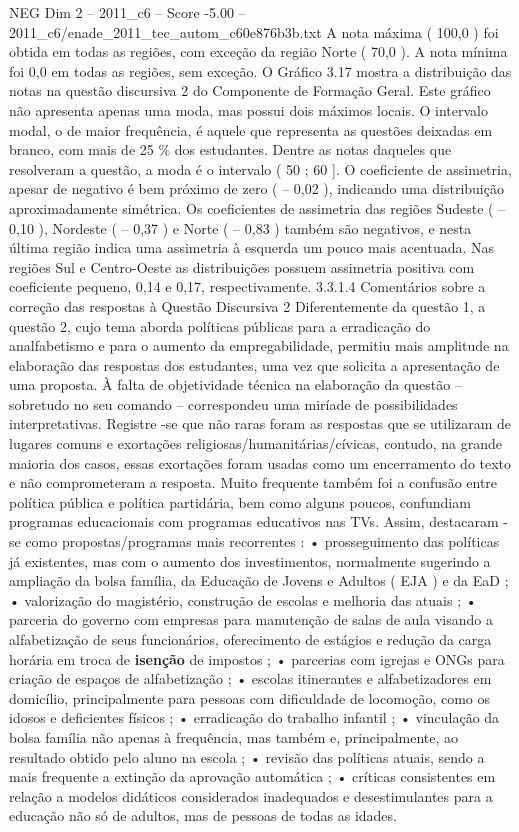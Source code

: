 \begin{textsample}{NEG Dim 2 – 2011\_c6 – Score -5.00 – 2011\_c6/enade\_2011\_tec\_autom\_c60e876b3b.txt}
A nota máxima ( 100,0 ) foi obtida em todas as regiões, com exceção da região Norte ( 70,0 ).
A nota mínima foi 0,0 em todas as regiões, sem exceção.
O Gráfico 3.17 mostra a distribuição das notas na questão discursiva 2 do Componente de Formação Geral.
Este gráfico não apresenta apenas uma moda, mas possui dois máximos locais.
O intervalo modal, o de maior frequência, é aquele que representa as questões deixadas em branco, com mais de 25 \% dos estudantes.
Dentre as notas daqueles que resolveram a questão, a moda é o intervalo ( 50 ; 60 ].
O coeficiente de assimetria, apesar de negativo é bem próximo de zero ( – 0,02 ), indicando uma distribuição aproximadamente simétrica.
Os coeficientes de assimetria das regiões Sudeste ( – 0,10 ), Nordeste ( – 0,37 ) e Norte ( – 0,83 ) também são negativos, e nesta última região indica uma assimetria à esquerda um pouco mais acentuada.
Nas regiões Sul e Centro-Oeste as distribuições possuem assimetria positiva com coeficiente pequeno, 0,14 e 0,17, respectivamente. 3.3.1.4 Comentários sobre a correção das respostas à Questão Discursiva 2 Diferentemente da questão 1, a questão 2, cujo tema aborda políticas públicas para a erradicação do analfabetismo e para o aumento da empregabilidade, permitiu mais amplitude na elaboração das respostas dos estudantes, uma vez que solicita a apresentação de uma proposta.
À falta de objetividade técnica na elaboração da questão – sobretudo no seu comando – correspondeu uma miríade de possibilidades interpretativas.
Registre -se que não raras foram as respostas que se utilizaram de lugares comuns e exortações religiosas/humanitárias/cívicas, contudo, na grande maioria dos casos, essas exortações foram usadas como um encerramento do texto e não comprometeram a resposta.
Muito frequente também foi a confusão entre política pública e política partidária, bem como alguns poucos, confundiam programas educacionais com programas educativos nas TVs.
Assim, destacaram -se como propostas/programas mais recorrentes : • prosseguimento das políticas já existentes, mas com o aumento dos investimentos, normalmente sugerindo a ampliação da bolsa família, da Educação de Jovens e Adultos ( EJA ) e da EaD ; • valorização do magistério, construção de escolas e melhoria das atuais ; • parceria do governo com empresas para manutenção de salas de aula visando a alfabetização de seus funcionários, oferecimento de estágios e redução da carga horária em troca de \textbf{isenção} de impostos ; • parcerias com igrejas e ONGs para criação de espaços de alfabetização ; • escolas itinerantes e alfabetizadores em domicílio, principalmente para pessoas com dificuldade de locomoção, como os idosos e deficientes físicos ; • erradicação do trabalho infantil ; • vinculação da bolsa família não apenas à frequência, mas também e, principalmente, ao resultado obtido pelo aluno na escola ; • revisão das políticas atuais, sendo a mais frequente a extinção da aprovação automática ; • críticas consistentes em relação a modelos didáticos considerados inadequados e desestimulantes para a educação não só de adultos, mas de pessoas de todas as idades.

\end{textsample}
